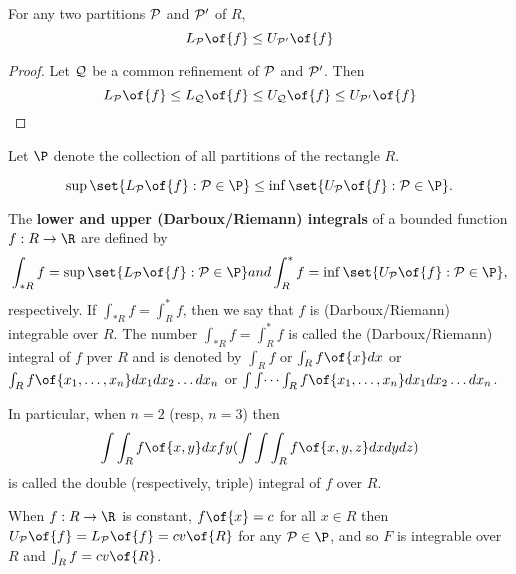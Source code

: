 \begin{corollary}
    For any two partitions $\cal{P}$ and $\cal{P}'$ of $R$,
    \[L_{\cal{P}}\of{f} \leq U_{\cal{P}'}\of{f}\]
\end{corollary}
\begin{proof}
    Let $\cal{Q}$ be a common refinement of $\cal{P}$ and $\cal{P}'$.
    Then \[L_{\cal{P}}\of{f} \leq L_{\cal{Q}}\of{f} \leq U_{\cal{Q}}\of{f} \leq U_{\cal{P}'}\of{f}\]
\end{proof}

Let $\P$ denote the collection of all partitions of the rectangle $R$.

\begin{corollary}
    \[\sup \set{L_{\cal{P}}\of{f}: \cal{P} \in \P} \leq \inf \set{U_{\cal{P}}\of{f}: \cal{P} \in \P}.\]
\end{corollary}

\begin{definition}
    The \textbf{lower and upper (Darboux/Riemann) integrals} of a bounded function $f: R \to \R$ are defined by 
    \[\int_{*R} f = \sup \set{L_{\cal{P}}\of{f}: \cal{P} \in \P} and \int_R^* f = \inf \set{U_{\cal{P}}\of{f}: \cal{P} \in \P},\]
    respectively. If $\int_{*R} f = \int_R^* f$, then we say that $f$ is (Darboux/Riemann) integrable over $R$. The number $\int_{*R} f = \int_R^* f$ is called the (Darboux/Riemann) integral of $f$ pver $R$ and is denoted by $\int_R f$ or $\int_R f\of{x} dx$ or $\int_R f\of{x_1, \dots, x_n} dx_1 dx_2 \dots dx_n$ or $\int \int \dots \int_R f\of{x_1, \dots, x_n} dx_1 dx_2 \dots dx_n$.

    In particular, when $n = 2$ (resp, $n = 3$) then \[\int\int_R f\of{x,y} dxfy (\int\int\int_R f\of{x,y,z} dxdydz)\]
    is called the double (respectively, triple) integral of $f$ over $R$.
\end{definition}

\begin{example}
    When $f: R \to \R$ is constant, $f\of{x} = c$ for all $x \in R$ then $U_{\cal{P}}\of{f} = L_{\cal{P}}\of{f} = cv\of{R}$ for any $\cal{P} \in \P$, and so $F$ is integrable over $R$ and $\int_R f = cv\of{R}$.
\end{example}

